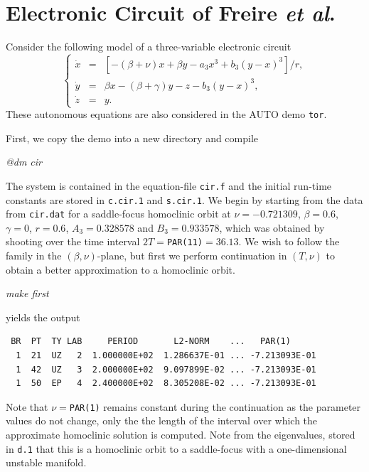\documentclass[12pt]{report}
\begin{document}
\section{ Electronic Circuit of Freire {\it et al}.}
Consider the following model of a three-variable electronic circuit
\cite{FrRLuGaPo:93}
 \begin{equation}
\left \{ 
\begin{array}{rcl}
\dot{x} & = & \left [-(\beta+\nu) x + \beta y -a_3 x^3 
+b_3(y-x)^3\right ]/r, \\
\dot{y} & = & \beta x -(\beta+\gamma)y -z -b_3(y-x)^3, \\
\dot{z} & = & y.
\end{array}
\right.  
\label{5.fr1}
\end{equation}
These autonomous equations are also considered in the {\cal AUTO} demo {\tt tor}.

First, we copy the demo into a new directory and compile
\begin{center}
{\it @dm cir} \\
\end{center}
The system is contained in 
the equation-file {\tt cir.f} and the initial run-time constants
are stored in {\tt c.cir.1} and {\tt s.cir.1}. We begin by starting from
the data from {\tt cir.dat} for a saddle-focus homoclinic orbit 
at 
$\nu=-0.721309$, $\beta=0.6$, $\gamma=0$, $r=0.6$, $A_3=0.328578$ 
and $B_3=0.933578$, which was obtained by shooting over 
the time interval $2T=${\tt PAR(11)}$=36.13$.
We wish to follow the family in the $(\beta,\nu)$-plane, but 
first we perform continuation in $(T,\nu)$ to obtain a better 
approximation to a homoclinic orbit.
\begin{center}
{\it make first}
\end{center} 
yields the output
\begin{verbatim}
 BR  PT  TY LAB     PERIOD       L2-NORM    ...   PAR(1)     
  1  21  UZ   2  1.000000E+02  1.286637E-01 ... -7.213093E-01
  1  42  UZ   3  2.000000E+02  9.097899E-02 ... -7.213093E-01
  1  50  EP   4  2.400000E+02  8.305208E-02 ... -7.213093E-01
\end{verbatim}
Note that $\nu=${\tt PAR(1)} remains constant during the continuation
as the parameter values do not change, only the the length of
the interval over which the approximate homoclinic solution is computed.
Note from the eigenvalues, stored in {\tt d.1} that this is a homoclinic
orbit to a saddle-focus with a one-dimensional unstable manifold.
\end{document}
